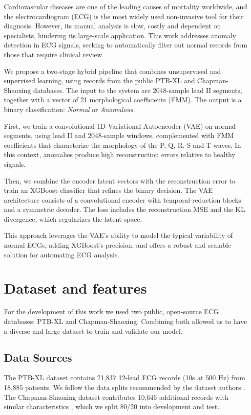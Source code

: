 \documentclass[11pt]{article}
\begin{document}
Cardiovascular diseases are one of the leading causes of mortality worldwide, and the electrocardiogram (ECG) is the most widely used non-invasive tool for their diagnosis. However, its manual analysis is slow, costly and dependent on specialists, hindering its large-scale application. This work addresses anomaly detection in ECG signals, seeking to automatically filter out normal records from those that require clinical review.

We propose a two-stage hybrid pipeline that combines unsupervised and supervised learning, using records from the public PTB-XL and Chapman-Shaoxing databases. The input to the system are 2048-sample lead II segments, together with a vector of 21 morphological coefficients (FMM). The output is a binary classification: \textit{Normal} or \textit{Anomalous}.

First, we train a convolutional 1D Variational Autoencoder (VAE) on normal segments, using lead II and 2048-sample windows, complemented with FMM coefficients that characterize the morphology of the P, Q, R, S and T waves. In this context, anomalies produce high reconstruction errors relative to healthy signals.

Then, we combine the encoder latent vectors with the reconstruction error to train an XGBoost classifier that refines the binary decision. The VAE architecture consists of a convolutional encoder with temporal-reduction blocks and a symmetric decoder. The loss includes the reconstruction MSE and the KL divergence, which regularizes the latent space.

This approach leverages the VAE's ability to model the typical variability of normal ECGs, adding XGBoost's precision, and offers a robust and scalable solution for automating ECG analysis.


\section{Dataset and features}
For the development of this work we used two public, open-source ECG databases: PTB-XL and Chapman-Shaoxing. Combining both allowed us to have a diverse and large dataset to train and validate our model.

\subsection{Data Sources}
The PTB-XL dataset contains 21,837 12-lead ECG records (10s at 500 Hz) from 18,885 patients. We follow the data splits recommended by the dataset authors \cite{wagner2020ptb}. The Chapman-Shaoxing dataset contributes 10,646 additional records with similar characteristics \cite{zheng2020chapman}, which we split 80/20 into development and test.
\end{document}
